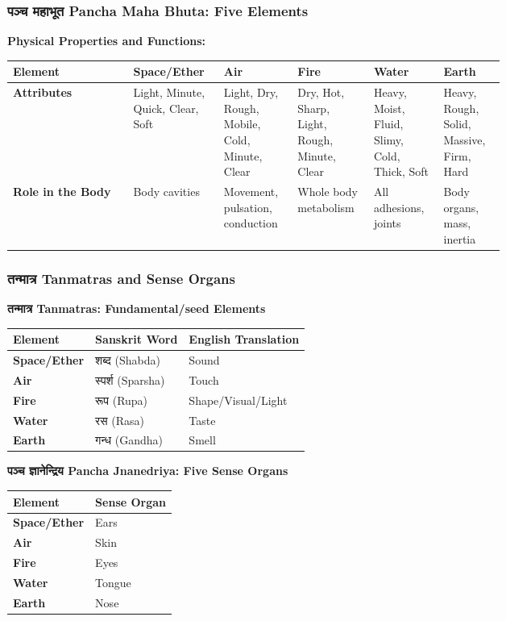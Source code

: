 \begin{frame}[fragile]\frametitle{पञ्च  महाभूत   Pancha Maha Bhuta: Five Elements}

    \textbf{Physical Properties and Functions:}
	
	
        \begin{tabular}{|p{0.21\linewidth}|p{0.1\linewidth}|p{0.1\linewidth}|p{0.1\linewidth}|p{0.1\linewidth}|p{0.1\linewidth}|}
    \hline
    \textbf{Element} & \textbf{Space/Ether} & \textbf{Air} & \textbf{Fire} & \textbf{Water} & \textbf{Earth} \\
    \hline
    \textbf{Attributes} & Light, Minute, Quick, Clear, Soft & Light, Dry, Rough, Mobile, Cold, Minute, Clear & Dry, Hot, Sharp, Light, Rough, Minute, Clear & Heavy, Moist, Fluid, Slimy, Cold, Thick, Soft & Heavy, Rough, Solid, Massive, Firm, Hard \\
    \hline
    \textbf{Role in the Body} & Body cavities & Movement, pulsation, conduction & Whole body metabolism & All adhesions, joints & Body organs, mass, inertia \\
    \hline
    \end{tabular}

\end{frame}


\begin{frame}[fragile]\frametitle{तन्मात्र Tanmatras and Sense Organs}
    \textbf{तन्मात्र Tanmatras: Fundamental/seed Elements}
	
	
    \begin{tabular}{|l|l|l|}
    \hline
    \textbf{Element} & \textbf{Sanskrit Word} & \textbf{English Translation} \\
    \hline
    \textbf{Space/Ether} & शब्द (Shabda) & Sound \\
    \hline
    \textbf{Air} & स्पर्श (Sparsha) & Touch \\
    \hline
    \textbf{Fire} & रूप (Rupa) & Shape/Visual/Light \\
    \hline
    \textbf{Water} & रस (Rasa) & Taste \\
    \hline
    \textbf{Earth} & गन्ध (Gandha) & Smell \\
    \hline
    \end{tabular}


    \textbf{पञ्च  ज्ञानेन्द्रिय  Pancha Jnanedriya: Five Sense Organs}
	
    \begin{tabular}{|l|l|}
    \hline
    \textbf{Element} & \textbf{Sense Organ} \\
    \hline
    \textbf{Space/Ether} & Ears \\
    \hline
    \textbf{Air} & Skin \\
    \hline
    \textbf{Fire} & Eyes \\
    \hline
    \textbf{Water} & Tongue \\
    \hline
    \textbf{Earth} & Nose \\
    \hline
    \end{tabular}
\end{frame}

